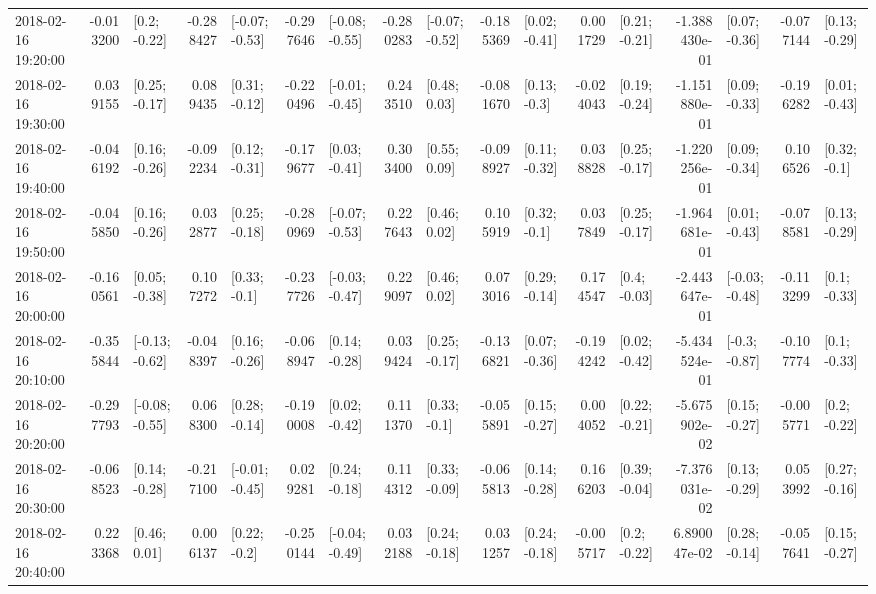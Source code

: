 \begin{tabular}{lrlrlrlrlrlrlrlrl}
2018-02-16 19:20:00 & -0.013200 &    [0.2; -0.22] & -0.288427 &  [-0.07; -0.53] & -0.297646 &  [-0.08; -0.55] & -0.280283 &  [-0.07; -0.52] & -0.185369 &   [0.02; -0.41] &  0.001729 &   [0.21; -0.21] & -1.388430e-01 &   [0.07; -0.36] & -0.077144 &   [0.13; -0.29] \\
2018-02-16 19:30:00 &  0.039155 &   [0.25; -0.17] &  0.089435 &   [0.31; -0.12] & -0.220496 &  [-0.01; -0.45] &  0.243510 &    [0.48; 0.03] & -0.081670 &    [0.13; -0.3] & -0.024043 &   [0.19; -0.24] & -1.151880e-01 &   [0.09; -0.33] & -0.196282 &   [0.01; -0.43] \\
2018-02-16 19:40:00 & -0.046192 &   [0.16; -0.26] & -0.092234 &   [0.12; -0.31] & -0.179677 &   [0.03; -0.41] &  0.303400 &    [0.55; 0.09] & -0.098927 &   [0.11; -0.32] &  0.038828 &   [0.25; -0.17] & -1.220256e-01 &   [0.09; -0.34] &  0.106526 &    [0.32; -0.1] \\
2018-02-16 19:50:00 & -0.045850 &   [0.16; -0.26] &  0.032877 &   [0.25; -0.18] & -0.280969 &  [-0.07; -0.53] &  0.227643 &    [0.46; 0.02] &  0.105919 &    [0.32; -0.1] &  0.037849 &   [0.25; -0.17] & -1.964681e-01 &   [0.01; -0.43] & -0.078581 &   [0.13; -0.29] \\
2018-02-16 20:00:00 & -0.160561 &   [0.05; -0.38] &  0.107272 &    [0.33; -0.1] & -0.237726 &  [-0.03; -0.47] &  0.229097 &    [0.46; 0.02] &  0.073016 &   [0.29; -0.14] &  0.174547 &    [0.4; -0.03] & -2.443647e-01 &  [-0.03; -0.48] & -0.113299 &    [0.1; -0.33] \\
2018-02-16 20:10:00 & -0.355844 &  [-0.13; -0.62] & -0.048397 &   [0.16; -0.26] & -0.068947 &   [0.14; -0.28] &  0.039424 &   [0.25; -0.17] & -0.136821 &   [0.07; -0.36] & -0.194242 &   [0.02; -0.42] & -5.434524e-01 &   [-0.3; -0.87] & -0.107774 &    [0.1; -0.33] \\
2018-02-16 20:20:00 & -0.297793 &  [-0.08; -0.55] &  0.068300 &   [0.28; -0.14] & -0.190008 &   [0.02; -0.42] &  0.111370 &    [0.33; -0.1] & -0.055891 &   [0.15; -0.27] &  0.004052 &   [0.22; -0.21] & -5.675902e-02 &   [0.15; -0.27] & -0.005771 &    [0.2; -0.22] \\
2018-02-16 20:30:00 & -0.068523 &   [0.14; -0.28] & -0.217100 &  [-0.01; -0.45] &  0.029281 &   [0.24; -0.18] &  0.114312 &   [0.33; -0.09] & -0.065813 &   [0.14; -0.28] &  0.166203 &   [0.39; -0.04] & -7.376031e-02 &   [0.13; -0.29] &  0.053992 &   [0.27; -0.16] \\
2018-02-16 20:40:00 &  0.223368 &    [0.46; 0.01] &  0.006137 &    [0.22; -0.2] & -0.250144 &  [-0.04; -0.49] &  0.032188 &   [0.24; -0.18] &  0.031257 &   [0.24; -0.18] & -0.005717 &    [0.2; -0.22] &  6.890047e-02 &   [0.28; -0.14] & -0.057641 &   [0.15; -0.27] \\

\end{tabular}
